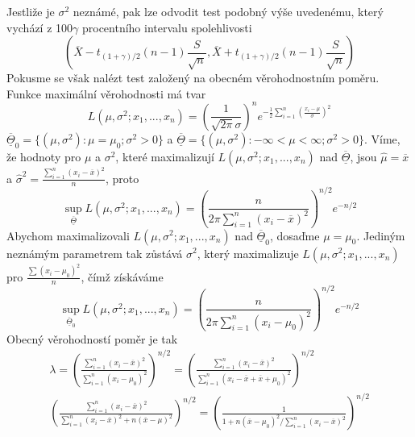Jestliže je $\sigma^2$ neznámé, pak lze odvodit test podobný výše uvedenému, který vychází z 100$\gamma$ procentního intervalu spolehlivosti
\begin{equation*}
\left(\overline{X} - t_{(1 + \gamma)/2}(n - 1)\frac{S}{\sqrt{n}}, \overline{X} + t_{(1 + \gamma)/2}(n - 1) \frac{S}{\sqrt{n}}\right)
\end{equation*}
Pokusme se však nalézt test založený na obecném věrohodnostním poměru. Funkce maximální věrohodnosti má tvar
\begin{equation*}
L(\mu, \sigma^2; x_1, ..., x_n) = \left(\frac{1}{\sqrt{2 \pi} \sigma}\right)^n e^{-\frac{1}{2}\sum_{i = 1}^n \left(\frac{x_i - \mu}{\sigma}\right)^2}
\end{equation*}
$\overline{\underline{\Theta}}_0 = \{(\mu, \sigma^2): \mu = \mu_0; \sigma^2 > 0\}$ a $\overline{\underline{\Theta}} = \{(\mu, \sigma^2): -\infty < \mu < \infty; \sigma^2 > 0\}$. Víme, že hodnoty pro $\mu$ a $\sigma^2$, které maximalizují $L(\mu, \sigma^2; x_1, ..., x_n)$ nad $\overline{\underline{\Theta}}$, jsou $\hat{\mu} = \overline{x}$ a $\hat{\sigma}^2 = \frac{\sum_{i = 1}^n (x_i - \overline{x})^2}{n}$, proto
\begin{equation*}
\sup_{\overline{\underline{\Theta}}} L(\mu, \sigma^2; x_1, ..., x_n) = \left(\frac{n}{2 \pi \sum_{i = 1}^n (x_i - \overline{x})^2}\right)^{n/2}e^{-n/2}
\end{equation*}
Abychom maximalizovali $L(\mu, \sigma^2; x_1, ..., x_n)$ nad $\overline{\underline{\Theta}}_0$, dosaďme $\mu = \mu_0$. Jediným neznámým parametrem tak zůstává $\sigma^2$, který maximalizuje $L(\mu, \sigma^2; x_1, ..., x_n)$ pro $\frac{\sum (x_i - \mu_0)^2}{n}$, čímž získáváme
\begin{equation*}
\sup_{\overline{\underline{\Theta}}_0} L(\mu, \sigma^2; x_1, ..., x_n) = \left(\frac{n}{2 \pi \sum_{i = 1}^n (x_i - \mu_0)^2}\right)^{n/2}e^{-n/2}
\end{equation*}
Obecný věrohodností poměr je tak
\begin{gather*}
\lambda = \left(\frac{\sum_{i = 1}^n (x_i - \overline{x})^2}{\sum_{i = 1}^n (x_i - \mu_0)^2}\right)^{n/2} = \left(\frac{\sum_{i = 1}^n (x_i - \overline{x})^2}{\sum_{i = 1}^n (x_i - \overline{x} + \overline{x} + \mu_0)^2}\right)^{n/2}\\
\left(\frac{\sum_{i = 1}^n (x_i - \overline{x})^2}{\sum_{i = 1}^n (x_i - \overline{x})^2 + n(\overline{x} - \mu)^2}\right)^{n/2} = \left(\frac{1}{1 + n(\overline{x} - \mu_0)^2 / \sum_{i = 1}^n(x_i - \overline{x})^2}\right)^{n/2}
\end{gather*}
